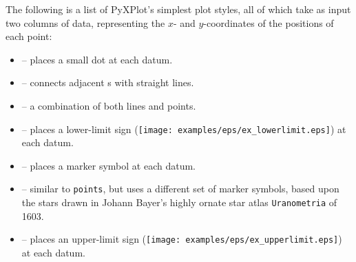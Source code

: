 The following is a list of PyXPlot's simplest plot styles, all of which take as
input two columns of data, representing the $x$- and $y$-coordinates of the
positions of each point:
\begin{itemize}
\item {} -- places a small dot at each datum.
\item {} -- connects adjacent \datapoint s with straight lines.
\item {} -- a combination of both lines and points.
\item {} -- places a lower-limit sign (\texttt{[image: examples/eps/ex\_lowerlimit.eps]}) at each datum.
\item {} -- places a marker symbol at each datum.
\item {} -- similar to {\tt points}, but uses a different set of marker symbols, based upon the stars drawn in Johann Bayer's highly ornate star atlas {\tt Uranometria} of 1603.
\item {} -- places an upper-limit sign (\texttt{[image: examples/eps/ex\_upperlimit.eps]}) at each datum.
\end{itemize}

